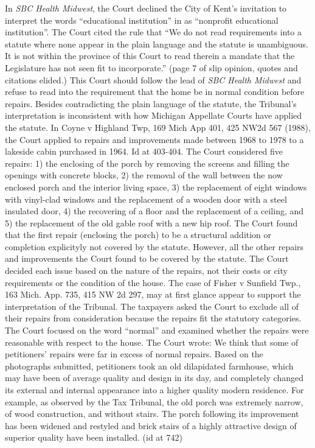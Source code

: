 In \textit{SBC Health Midwest}, the Court declined the City of Kent's invitation to interpret the words ``educational institution'' in  as ``nonprofit educational institution''. The Court cited the rule that ``We do not read requirements into a statute where none appear in the plain language and the statute is unambiguous. It is not within the province of this Court to read therein a mandate that the Legislature has not seen fit to incorporate.'' (page 7 of slip opinion, quotes and citations elided.) This Court should follow the lead of \textit{SBC Health Midwest} and refuse to read into  the requirement that the home be in normal condition before repairs.
Besides contradicting the plain language of the statute, the Tribunal's interpretation is inconsistent with how Michigan Appellate Courts have applied the statute. In Coyne v Highland Twp, 169 Mich App 401, 425 NW2d 567 (1988), the Court applied  to repairs and improvements made between 1968 to 1978 to a lakeside cabin purchased in 1964. Id at 403-404. The Court considered five repairs: 1) the enclosing of the porch by removing the screens and filling the openings with concrete blocks, 2) the removal of the wall between the now enclosed porch and the interior living space, 3) the replacement of eight windows with vinyl-clad windows and the replacement of a wooden door with a steel insulated door, 4) the recovering of a floor and the replacement of a ceiling, and 5) the replacement of the old gable roof with a new hip roof. The Court found that the first repair (enclosing the porch) to be a structural addition or completion explicityly not covered by the statute. However, all the other repairs and improvements the Court found to be covered by the statute. The Court decided each issue based on the nature of the repairs, not their costs or city requirements or the condition of the house. 
The case of Fisher v Sunfield Twp., 163 Mich. App. 735, 415 NW 2d 297, may at first glance appear to support the interpretation of the Tribunal. The taxpayers asked the Court to exclude all of their repairs from consideration because the repairs fit the statutory categories. The Court focused on the word ``normal'' and examined whether the repairs were reasonable with respect to the house. The Court wrote: 
We think that some of petitioners' repairs were far in excess of normal repairs. Based on the photographs submitted, petitioners took an old dilapidated farmhouse, which may have been of average quality and design in its day, and completely changed its external and internal appearance into a higher quality modern residence. For example, as observed by the Tax Tribunal, the old porch was extremely narrow, of wood construction, and without stairs. The porch following its improvement has been widened and restyled and brick stairs of a highly attractive design of superior quality have been installed. (id at 742)
 
